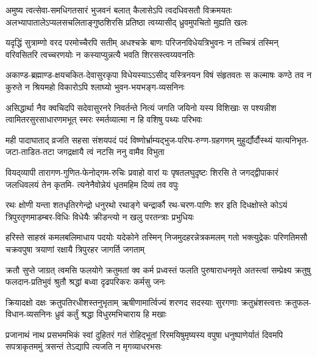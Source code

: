 \fourlineindentedshloka
{अमुष्य त्वत्सेवा-समधिगतसारं भुजवनं}
{बलात् कैलासेऽपि त्वदधिवसतौ विक्रमयतः}
{अलभ्यापातालेऽप्यलसचलिताङ्गुष्ठशिरसि}
{प्रतिष्ठा त्वय्यासीद् ध्रुवमुपचितो मुह्यति खलः}%

\fourlineindentedshloka
{यदृद्धिं सुत्राम्णो वरद परमोच्चैरपि सतीम्}
{अधश्चक्रे बाणः परिजनविधेयत्रिभुवनः}
{न तच्चित्रं तस्मिन् वरिवसितरि त्वच्चरणयोः}
{न कस्याप्युन्नत्यै भवति शिरसस्त्वय्यवनतिः}%

\fourlineindentedshloka
{अकाण्ड-ब्रह्माण्ड-क्षयचकित-देवासुरकृपा}
{विधेयस्याऽऽसीद् यस्त्रिनयन विषं संहृतवतः}
{स कल्माषः कण्ठे तव न कुरुते न श्रियमहो}
{विकारोऽपि श्लाघ्यो भुवन-भयभङ्ग-व्यसनिनः}%

\fourlineindentedshloka
{असिद्धार्था नैव क्वचिदपि सदेवासुरनरे}
{निवर्तन्ते नित्यं जगति जयिनो यस्य विशिखाः}
{स पश्यन्नीश त्वामितरसुरसाधारणमभूत्}
{स्मरः स्मर्तव्यात्मा न हि वशिषु पथ्यः परिभवः}%

\fourlineindentedshloka
{मही पादाघाताद् व्रजति सहसा संशयपदं}
{पदं विष्णोर्भ्राम्यद्भुज-परिघ-रुग्ण-ग्रहगणम्}
{मुहुर्द्यौर्दौस्थ्यं यात्यनिभृत-जटा-ताडित-तटा}
{जगद्रक्षायै त्वं नटसि ननु वामैव विभुता}%

\fourlineindentedshloka
{वियद्‍व्यापी तारागण-गुणित-फेनोद्गम-रुचिः}
{प्रवाहो वारां यः पृषतलघुदृष्टः शिरसि ते}
{जगद्द्वीपाकारं जलधिवलयं तेन कृतमि-}
{त्यनेनैवोन्नेयं धृतमहिम दिव्यं तव वपुः}%

\fourlineindentedshloka
{रथः क्षोणी यन्ता शतधृतिरगेन्द्रो धनुरथो}
{रथाङ्गे चन्द्रार्कौ रथ-चरण-पाणिः शर इति}
{दिधक्षोस्ते कोऽयं त्रिपुरतृणमाडम्बर-विधिः}
{विधेयैः क्रीडन्त्यो न खलु परतन्त्राः प्रभुधियः}%

\fourlineindentedshloka
{हरिस्ते साहस्रं कमलबलिमाधाय पदयोः}
{यदेकोने तस्मिन् निजमुदहरन्नेत्रकमलम्}
{गतो भक्त्युद्रेकः परिणतिमसौ चक्रवपुषा}
{त्रयाणां रक्षायै त्रिपुरहर जागर्ति जगताम्}%

\fourlineindentedshloka
{क्रतौ सुप्ते जाग्रत् त्वमसि फलयोगे क्रतुमतां}
{क्व कर्म प्रध्वस्तं फलति पुरुषाराधनमृते}
{अतस्त्वां सम्प्रेक्ष्य क्रतुषु फलदान-प्रतिभुवं}
{श्रुतौ श्रद्धां बध्वा दृढपरिकरः कर्मसु जनः}%

\fourlineindentedshloka
{क्रियादक्षो दक्षः क्रतुपतिरधीशस्तनुभृताम्}
{ऋषीणामार्त्विज्यं शरणद सदस्याः सुरगणाः}
{क्रतुभ्रंशस्त्वत्तः क्रतुफल-विधान-व्यसनिनः}
{ध्रुवं कर्तुं श्रद्धा विधुरमभिचाराय हि मखाः}%

\fourlineindentedshloka
{प्रजानाथं नाथ प्रसभमभिकं स्वां दुहितरं}
{गतं रोहिद्भूतां रिरमयिषुमृष्यस्य वपुषा}
{धनुष्पाणेर्यातं दिवमपि सपत्राकृतममुं}
{त्रसन्तं तेऽद्यापि त्यजति न मृगव्याधरभसः}%

